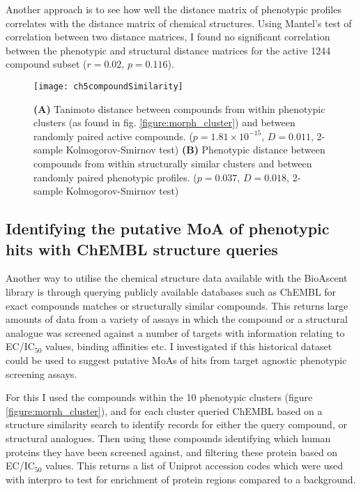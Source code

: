 \documentclass[a4paper,11pt,twoside,openright]{scrbook}
\begin{document}
Another approach is to see how well the distance matrix of phenotypic profiles correlates with the distance matrix of 
chemical structures.
Using Mantel's test of correlation between two distance matrices, \cite{Mantel1967} I found no significant correlation 
between the phenotypic and structural distance matrices for the active 1244 compound subset ($r = 0.02$, $p = 0.116$).


\begin{figure}
    \captionsetup{width=0.8\textwidth}
    \caption[Comparison of structural and phenotypically similar compounds]{
        \textbf{(A)} Tanimoto distance between compounds from within phenotypic clusters (as found in fig. 
\ref{figure:morph_cluster}) and between randomly paired active compounds.
        ($p=1.81\times10^{-15}$, $D=0.011$, 2-sample Kolmogorov-Smirnov test)
    \textbf{(B)} Phenotypic distance between compounds from within structurally similar clusters and between randomly 
paired phenotypic profiles.
    ($p=0.037$, $D=0.018$, 2-sample Kolmogorov-Smirnov test)
}
    \texttt{[image: ch5compoundSimilarity]}
    \label{figure:compound_pheno_corr}
\end{figure}





\subsection{Identifying the putative MoA of phenotypic hits with ChEMBL structure queries}

Another way to utilise the chemical structure data available with the BioAscent library is through querying publicly 
available databases such as ChEMBL for exact compounds matches or structurally similar compounds.
This returns large amounts of data from a variety of assays in which the compound or a structural analogue was screened 
against a number of targets with information relating to EC/IC$_{50}$ values, binding affinities etc.
I investigated if this historical dataset could be used to suggest putative MoAs of hits from target agnostic 
phenotypic screening assays.

For this I used the compounds within the 10 phenotypic clusters (figure \ref{figure:morph_cluster}), and for each 
cluster queried ChEMBL based on a structure similarity search to identify records for either the query compound, or 
structural analogues.
Then using these compounds identifying which human proteins they have been screened against, and filtering these 
protein based on EC/IC$_{50}$ values.
This returns a list of Uniprot accession codes which were used with interpro \cite{Finn2017} to test for enrichment of 
protein regions compared to a background.
\end{document}
